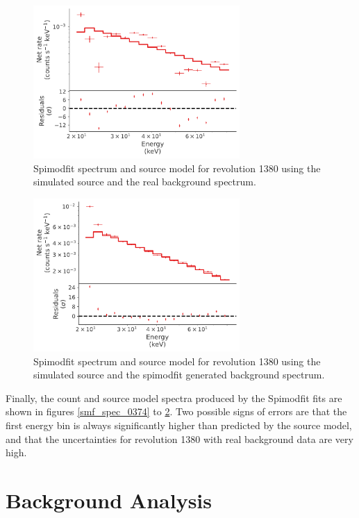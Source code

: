 \documentclass{article}
\begin{document}
\begin{figure}[h]
    \centering
    \includegraphics[width=0.7\textwidth]{Images/smf_spec_1380_sim_source.pdf}
    \caption{Spimodfit spectrum and source model for revolution 1380 using the simulated source and the real background spectrum.}
    \label{smf_spec_1380}
\end{figure}

\begin{figure}[h]
    \centering
    \includegraphics[width=0.7\textwidth]{Images/smf_spec_1380_sim_source_smf_bkg.pdf}
    \caption{Spimodfit spectrum and source model for revolution 1380 using the simulated source and the spimodfit generated background spectrum.}
    \label{smf_spec_1380_smf_bkg}
\end{figure}


Finally, the count and source model spectra produced by the Spimodfit fits are shown in figures \ref{smf_spec_0374} to \ref{smf_spec_1380_smf_bkg}. Two possible signs of errors are that the first energy bin is always significantly higher than predicted by the source model, and that the uncertainties for revolution 1380 with real background data are very high.

\section{Background Analysis}
\end{document}
